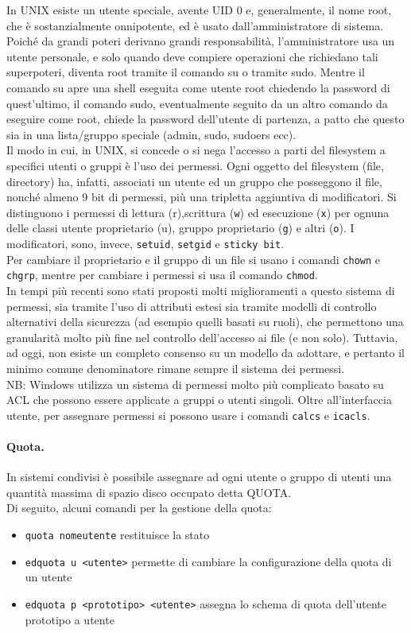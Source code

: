 \documentclass[a4paper]{report}
\begin{document}
In UNIX esiste un utente speciale, avente UID 0 e, generalmente, il nome root, che è
sostanzialmente onnipotente, ed è usato dall'amministratore di sistema. Poiché da
grandi poteri derivano grandi responsabilità, l'amministratore usa un utente
personale, e solo quando deve compiere operazioni che richiedano tali superpoteri,
diventa root tramite il comando su o tramite sudo. Mentre il comando su apre una shell
eseguita come utente root chiedendo la password di quest'ultimo, il comando sudo,
eventualmente seguito da un altro comando da eseguire come root, chiede la
password dell'utente di partenza, a patto che questo sia in una lista/gruppo speciale
(admin, sudo, sudoers ecc).\\
Il modo in cui, in UNIX, si concede o si nega l'accesso a parti del filesystem a specifici utenti o
gruppi è l'uso dei permessi. Ogni oggetto del filesystem (file, directory) ha, infatti, associati un
utente ed un gruppo che posseggono il file, nonché almeno 9 bit di permessi, più una tripletta
aggiuntiva di modificatori. Si distinguono i permessi di lettura (r),scrittura (\texttt{w}) ed esecuzione
(\texttt{x}) per ognuna delle classi utente proprietario (u), gruppo proprietario (\texttt{g}) e altri (\texttt{o}). I
modificatori, sono, invece, \texttt{setuid}, \texttt{setgid} e \texttt{sticky bit}.\\
Per cambiare il proprietario e il gruppo di un file si usano i comandi \texttt{chown} e \texttt{chgrp}, mentre
per cambiare i permessi si usa il comando \texttt{chmod}.\\
In tempi più recenti sono stati proposti molti miglioramenti a questo sistema di permessi, sia
tramite l'uso di attributi estesi sia tramite modelli di controllo alternativi della sicurezza (ad
esempio quelli basati su ruoli), che permettono una granularità molto più fine nel controllo
dell'accesso ai file (e non solo). Tuttavia, ad oggi, non esiste un completo consenso su un
modello da adottare, e pertanto il minimo comune denominatore rimane sempre il sistema dei
permessi.\\
NB: Windows utilizza un sistema di permessi molto più complicato basato su ACL che
possono essere applicate a gruppi o utenti singoli. Oltre all'interfaccia utente, per assegnare
permessi si possono usare i comandi \texttt{calcs} e \texttt{icacls}.\\
\paragraph{Quota.} In sistemi condivisi è possibile assegnare ad ogni
utente o gruppo di utenti una quantità massima di
spazio disco occupato detta QUOTA.\\ 
Di seguito, alcuni comandi per la gestione della quota:
\begin{itemize}
\item \texttt{quota nomeutente} restituisce la stato
\item \texttt{edquota u
<utente>} permette di cambiare la
configurazione della quota di un utente
\item \texttt{edquota p
<prototipo> <utente>} assegna lo
schema di quota dell'utente prototipo a utente
\end{itemize}
\end{document}
